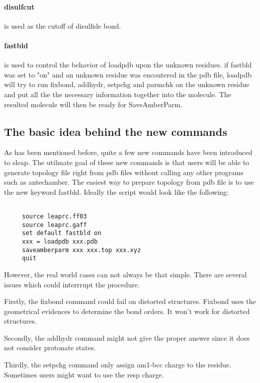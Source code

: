 \documentclass[letterpaper]{article}
\begin{document}
\paragraph{disulfcut} is used as the cutoff of disulfide bond.


\paragraph{fastbld} is used to control the behavior of loadpdb upon the unknown residues.
if fastbld was set to "on" and an unknown residue was encoutered in the pdb file, loadpdb 
will try to run fixbond, addhydr, setpchg and parmchk on the unknown residue and put all the
the necessary information together into the molecule. The resulted molecule will then be
ready for SaveAmberParm.


\subsection{The basic idea behind the new commands}
    As has been mentioned before, quite a few new commands have been introduced to sleap. The
utilmate goal of these new commands is that users will be able to generate topology file right
from pdb files without calling any other programs such as antechamber. 
    The easiest way to prepare topology from pdb file is to use the new keyword fastbld. Ideally
the script would look like the following:

\begin{lstlisting}

     source leaprc.ff03
     source leaprc.gaff
     set default fastbld on
     xxx = loadpdb xxx.pdb
     saveamberparm xxx xxx.top xxx.xyz
     quit

\end{lstlisting}

    However, the real world cases can not always be that simple. There are several issues which
could interrrupt the procedure. 

    Firstly, the fixbond command could fail on distorted structures. Fixbond uses the geometrical
evidences to determine the bond orders. It won't work for distorted structures.

    Secondly, the addhydr command might not give the proper answer since it does not consider
protonate states.

    Thirdly, the setpchg command only assign am1-bcc charge to the residue. Sometimes users might
want to use the resp charge.
\end{document}
